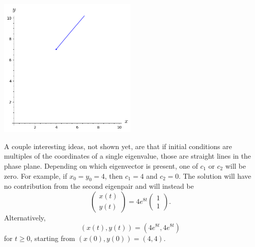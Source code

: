 \documentclass{article}
\begin{document}
\includegraphics[width = 0.5\textwidth]{linear_sys.png}

A couple interesting ideas, not shown yet, are that if initial conditions are multiples of the coordinates of a single eigenvalue, those are straight lines in the phase plane.  Depending on which eigenvector is present, one of \(c_1\) or \(c_2\) will be zero.  For example, if \(x_0 = y_0 = 4\), then \(c_1 = 4\) and \(c_2 = 0\). The solution will have no contribution from the second eigenpair and will instead  be \[\begin{pmatrix}x(t)\\y(t)\end{pmatrix} = 4 e^{8t}\begin{pmatrix}1\\1\end{pmatrix}.\] Alternatively, \[(x(t), y(t)) = (4e^{8t}, 4e^{8t})\] for \(t\geq 0\), starting from \((x(0), y(0)) = (4, 4)\).
\end{document}
